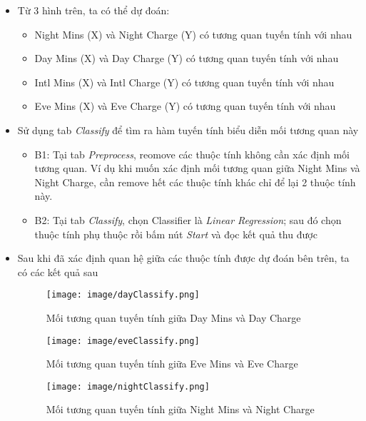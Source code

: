 \documentclass[a4paper, 12pt]{article}
\begin{document}
\begin{itemize}
\begin{itemize}
        \item Từ 3 hình trên, ta có thể dự đoán: 
        \begin{itemize}
            \item Night Mins (X) và Night Charge (Y) có tương quan tuyến tính với nhau
            \item Day Mins (X) và Day Charge (Y) có tương quan tuyến tính với nhau
            \item Intl Mins (X) và Intl Charge (Y) có tương quan tuyến tính với nhau
            \item Eve Mins (X) và Eve Charge (Y) có tương quan tuyến tính với nhau
        \end{itemize}

        \item Sử dụng tab \textit{Classify} để tìm ra hàm tuyến tính biểu diễn mối tương quan này 
        \begin{itemize}
            \item B1: Tại tab \textit{Preprocess}, reomove các thuộc tính không cần xác định mối tương quan. Ví dụ khi muốn xác định mối tương quan giữa Night Mins và Night Charge, cần remove hết các thuộc tính khác chỉ để lại 2 thuộc tính này.
            \item B2: Tại tab \textit{Classify}, chọn Classifier là \textit{Linear Regression}; sau đó chọn thuộc tính phụ thuộc rồi bấm nút \textit{Start} và đọc kết quả thu được
        \end{itemize}

        \item Sau khi đã xác định quan hệ giữa các thuộc tính được dự đoán bên trên, ta có các kết quả sau
        \begin{figure}[H]
            \begin{center}
                \texttt{[image: image/dayClassify.png]}
                \caption{Mối tương quan tuyến tính giữa Day Mins và Day Charge}

                \texttt{[image: image/eveClassify.png]}
                \caption{Mối tương quan tuyến tính giữa Eve Mins và Eve Charge}
            \end{center}
        \end{figure}

        \begin{figure}[H]
            \begin{center}
                \texttt{[image: image/nightClassify.png]}
                \caption{Mối tương quan tuyến tính giữa Night Mins và Night Charge}
            \end{center}
        \end{figure}


\end{itemize}
\end{itemize}
\end{document}
